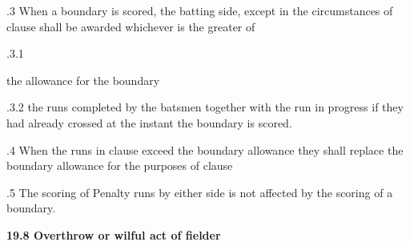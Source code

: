 \documentclass[12pt]{article}
\begin{document}
\vspace{\baselineskip}
\begin{adjustwidth}{0.5in}{0.12in}
{\fontsize{9pt}{10.8pt}.3 \tabto{0.49in} When a boundary is scored, the batting side, except in the circumstances of clause shall be awarded whichever is the greater of\par}\par

\end{adjustwidth}


\vspace{\baselineskip}
\begin{adjustwidth}{0.49in}{0.0in}
{\fontsize{9pt}{10.8pt}.3.1 \tabto{1.17in} {\fontsize{8pt}{9.6pt}\selectfont the allowance for the boundary\par}\par}\par

\end{adjustwidth}


\vspace{\baselineskip}
\begin{adjustwidth}{1.18in}{0.01in}
{\fontsize{9pt}{10.8pt}.3.2 \tabto{1.17in} the runs completed by the batsmen together with the run in progress if they had already crossed at the instant the boundary is scored.\par}\par

\end{adjustwidth}


\vspace{\baselineskip}
\begin{adjustwidth}{0.5in}{0.01in}
{\fontsize{9pt}{10.8pt}.4 \tabto{0.49in} When the runs in clause exceed the boundary allowance they shall replace the boundary allowance for the purposes of clause \par}\par

\end{adjustwidth}


\vspace{\baselineskip}
{\fontsize{9pt}{10.8pt}.5 \tabto{0.49in} The scoring of Penalty runs by either side is not affected by the scoring of a boundary.\par}\par


\vspace{\baselineskip}
{\fontsize{11pt}{13.2pt}\selectfont \textbf{19.8 \tabto{0.47in} Overthrow or wilful act of fielder}\par}\par
\end{document}
